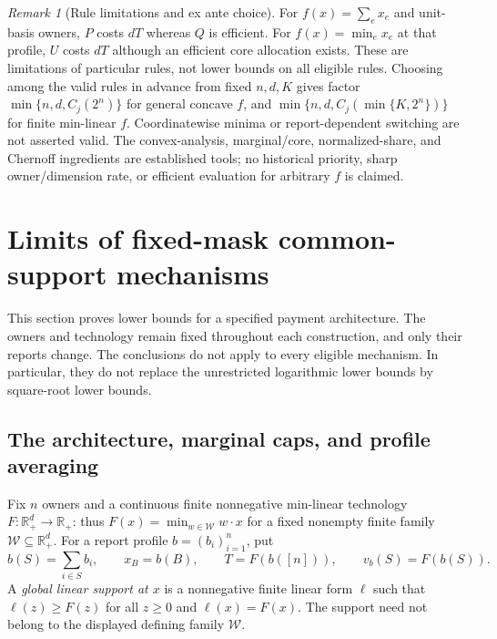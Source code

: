 \documentclass[11pt]{article}
\theoremstyle{definition}\newtheorem{definition}[theorem]{Definition}
\theoremstyle{remark}\newtheorem{remark}[theorem]{Remark}
\newcommand{\R}{\mathbb R}
\begin{document}
\begin{remark}[Rule limitations and ex ante choice]\label{ext:rem:limits}
For $f(x)=\sum_ex_e$ and unit-basis owners, $P$ costs $dT$ whereas $Q$ is
efficient.  For $f(x)=\min_ex_e$ at that profile, $U$ costs $dT$ although
an efficient core allocation exists.  These are limitations of particular
rules, not lower bounds on all eligible rules.
Choosing among the valid rules in advance from fixed $n,d,K$ gives factor
$\min\{n,d,C_j(2^n)\}$ for general concave $f$, and
$\min\{n,d,C_j(\min\{K,2^n\})\}$ for finite min-linear $f$.
Coordinatewise minima or report-dependent switching are not asserted valid.
The convex-analysis, marginal/core, normalized-share, and Chernoff ingredients
are established tools; no historical priority, sharp owner/dimension rate,
or efficient evaluation for arbitrary $f$ is claimed.
\end{remark}

\section{Limits of fixed-mask common-support mechanisms}\label{arch:section}

This section proves lower bounds for a specified payment architecture.
The owners and technology remain fixed throughout each construction, and only
their reports change. The conclusions do not apply to every eligible mechanism.
In particular, they do not replace the unrestricted logarithmic lower bounds
by square-root lower bounds.

\subsection{The architecture, marginal caps, and profile averaging}

Fix $n$ owners and a continuous finite nonnegative min-linear technology
$F:\R_+^d\to\R_+$: thus $F(x)=\min_{w\in\mathcal W}w\cdot x$ for a fixed
nonempty finite family $\mathcal W\subseteq\R_+^d$.
For a report profile $b=(b_i)_{i=1}^n$, put
\[
 b(S)=\sum_{i\in S}b_i,\qquad x_B=b(B),\qquad
 T=F(b([n])),\qquad v_b(S)=F(b(S)).
\]
A \emph{global linear support at $x$} is a nonnegative finite linear form
$\ell$ such that $\ell(z)\ge F(z)$ for all $z\ge0$ and $\ell(x)=F(x)$.
The support need not belong to the displayed defining family $\mathcal W$.
\end{document}
